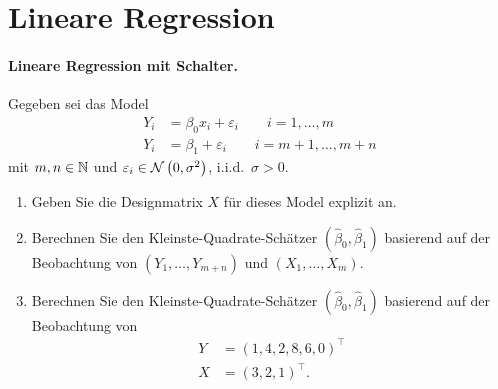 \section{Lineare Regression}


\paragraph{Lineare Regression mit Schalter.} Gegeben sei das Model
\begin{align*}
    Y_i &=  \beta_0 x_i + \varepsilon_i \quad\quad i=1,\ldots ,m \\
    Y_i &= \beta_1 + \varepsilon_i \quad\quad  i=m+1, \ldots , m+n
\end{align*}
mit $m,n \in \mathbb N$ und $\varepsilon_i \in \mathcal N \left( 0, \sigma^2 \right)$, i.i.d.\ $\sigma>0$.
\begin{enumerate}
    \item Geben Sie die Designmatrix $X$ für dieses Model explizit an.
    \item Berechnen Sie den Kleinste-Quadrate-Schätzer $\left( \hat \beta_0, \hat \beta_1 \right)$ 
        basierend auf der Beobachtung von  
        $\left( Y_1, \ldots , Y_{m+n} \right)$ und $\left( X_1, \ldots , X_m \right)$.
    \item Berechnen Sie den Kleinste-Quadrate-Schätzer $\left( \hat \beta_0,
        \hat \beta_1 \right)$ basierend auf der Beobachtung von
        \begin{align*}
            Y &= \left( 1,4,2,8,6,0 \right)^\top \\
            X &= \left( 3,2,1 \right)^\top.
        \end{align*}
\end{enumerate}

